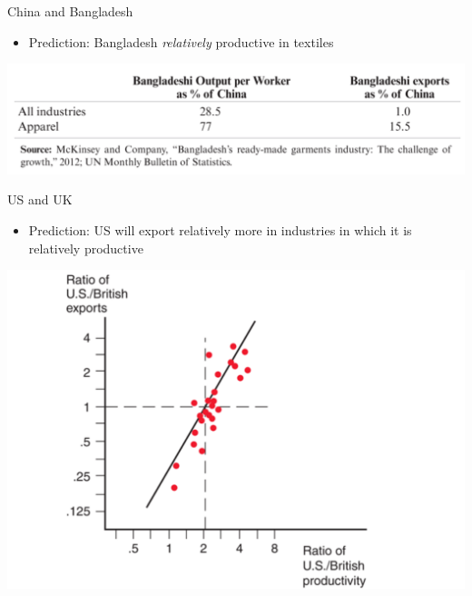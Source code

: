 \documentclass[ignorenonframetext,]{beamer}
\begin{document}
\begin{frame}{China and Bangladesh}

    \begin{itemize}
        \item Prediction: Bangladesh \emph{relatively} productive in textiles 
    \end{itemize}
    \includegraphics[scale=0.15]{bangladesh_china_cpa.png}

\end{frame}

\begin{frame}{US and UK}

    \begin{itemize}
        \item Prediction: US will export relatively more in industries in which it is relatively productive
    \end{itemize}
    \includegraphics[scale=0.20]{brit_us_exports.png}

\end{frame}
\end{document}
